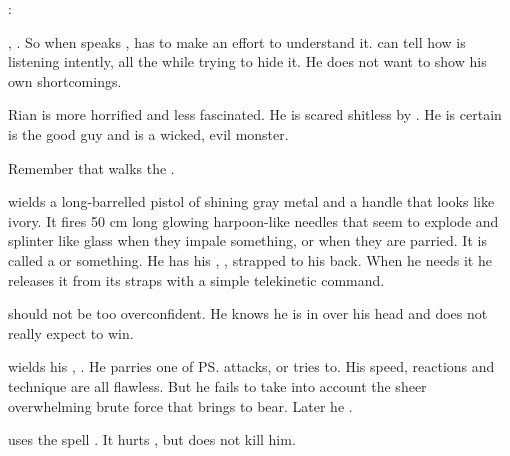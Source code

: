 \begin{changes}
\begin{prose}
      \Ishnaruchaefir:
    \end{prose}
    
    , \Teshrial {}. 
    So when \Ishnaruchaefir speaks \Draconic, \Teshrial has to make an effort to understand it. 
    \Criseis can tell how \Teshrial is listening intently, all the while trying to hide it.
    He does not want to show his own shortcomings. 

    \begin{comment}
      \subparagraph{Teshrial is killed}
    \end{comment}
    Rian is more horrified and less fascinated.
    He is scared shitless by \Ishnaruchaefir.
    He is certain \Teshrial is the good guy and \Ishnaruchaefir is a wicked, evil monster.
    
    Remember that \Teshrial{} walks the . 
    
    \Teshrial{} wields a long-barrelled pistol of shining gray metal and a handle that looks like ivory. 
    It fires 50 cm long glowing harpoon-like needles that seem to explode and splinter like glass when they impale something, or when they are parried. 
    It is called a  or something. 
    He has his \senaan, \Turishah, strapped to his back. 
    When he needs it he releases it from its straps with a simple telekinetic command. 
    
    \Teshrial{} should not be too overconfident. 
    He knows he is in over his head and does not really expect to win. 
    
    \Teshrial{} wields his , . 
    He parries one of \ps{\Ishnaruchaefir} attacks, or tries to. 
    His speed, reactions and technique are all flawless. 
    But he fails to take into account the sheer overwhelming brute force that \Ishnaruchaefir{} brings to bear. 
    Later he . 
    
    \Ishnaruchaefir{} uses the spell . 
    It hurts \Teshrial, but does not kill him. 
    

\end{changes}
